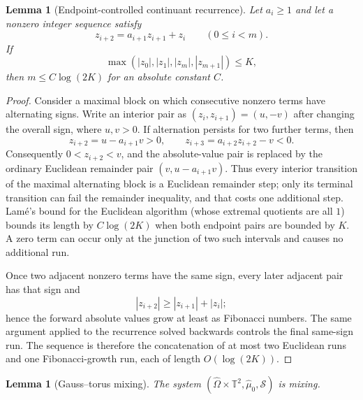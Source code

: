 \documentclass[11pt,a4paper]{amsart}
\newtheorem{lemma}[theorem]{Lemma}
\theoremstyle{definition}
\theoremstyle{remark}
\newcommand{\T}{\mathbb T}
\begin{document}
\begin{lemma}[Endpoint-controlled continuant recurrence]
\label{lem:endpoint-recurrence}
Let $a_i\ge1$ and let a nonzero integer sequence satisfy
\[
 z_{i+2}=a_{i+1}z_{i+1}+z_i\qquad(0\le i<m).
\]
If
\[
 \max(|z_0|,|z_1|,|z_m|,|z_{m+1}|)\le K,
\]
then $m\le C\log(2K)$ for an absolute constant $C$.
\end{lemma}

\begin{proof}
Consider a maximal block on which consecutive nonzero terms have alternating
signs.  Write an interior pair as $(z_i,z_{i+1})=(u,-v)$ after changing the
overall sign, where $u,v>0$.  If alternation persists for two further terms,
then
\[
 z_{i+2}=u-a_{i+1}v>0,
 \qquad
 z_{i+3}=a_{i+2}z_{i+2}-v<0.
\]
Consequently $0<z_{i+2}<v$, and the absolute-value pair is replaced by the
ordinary Euclidean remainder pair $(v,u-a_{i+1}v)$.  Thus every interior
transition of the maximal alternating block is a Euclidean remainder step;
only its terminal transition can fail the remainder inequality, and that
costs one additional step.  Lam\'e's bound for the Euclidean
algorithm (whose extremal quotients are all $1$) bounds its length by
$C\log(2K)$ when both endpoint pairs are bounded by $K$.  A zero term can
occur only at the junction of two such intervals and causes no additional
run.

Once two adjacent nonzero terms have the same sign, every later adjacent pair
has that sign and
\[
 |z_{i+2}|\ge |z_{i+1}|+|z_i|;
\]
hence the forward absolute values grow at least as Fibonacci numbers.  The
same argument applied to the recurrence solved backwards controls the final
same-sign run.  The sequence is therefore the concatenation of at most two
Euclidean runs and one Fibonacci-growth run, each of length
$O(\log(2K))$.
\end{proof}

\begin{lemma}[Gauss--torus mixing]\label{lem:torus-mixing}
The system $(\widehat\Omega\times\T^2,\widehat\mu_0,\mathcal S)$ is mixing.
\end{lemma}
\end{document}
